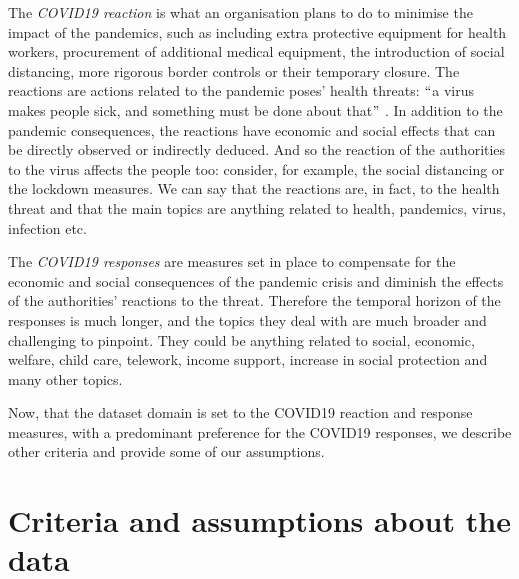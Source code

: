 The \textit{COVID19 reaction} is what an organisation plans to do to minimise the impact of the pandemics, such as including extra protective equipment for health workers, procurement of additional medical equipment, the introduction of social distancing, more rigorous border controls or their temporary closure. The reactions are actions related to the pandemic poses’ health threats: $``$a virus makes people sick, and something must be done about that$"$ . In addition to the pandemic consequences, the reactions have economic and social effects that can be directly observed or indirectly deduced. And so the reaction of the authorities to the virus affects the people too: consider, for example, the social distancing or the lockdown measures. We can say that the reactions are, in fact, to the health threat and that the main topics are anything related to health, pandemics, virus, infection etc. 

The \textit{COVID19 responses} are measures set in place to compensate for the economic and social consequences of the pandemic crisis and diminish the effects of the authorities' reactions to the threat. Therefore the temporal horizon of the responses is much longer, and the topics they deal with are much broader and challenging to pinpoint. They could be anything related to social, economic, welfare, child care, telework, income support, increase in social protection and many other topics. 

Now, that the dataset domain is set to the COVID19 reaction and response measures, with a predominant preference for the COVID19 responses, we describe other criteria and provide some of our assumptions.  

\section{Criteria and assumptions about the data}

